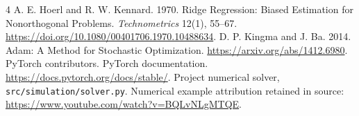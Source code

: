 \documentclass[sigconf]{acmart}
\begin{document}
\begin{thebibliography}{4}
 A. E. Hoerl and R. W. Kennard. 1970. Ridge Regression:
Biased Estimation for Nonorthogonal Problems. \textit{Technometrics} 12(1), 55--67.
\url{https://doi.org/10.1080/00401706.1970.10488634}.
 D. P. Kingma and J. Ba. 2014. Adam: A Method for Stochastic
Optimization. \url{https://arxiv.org/abs/1412.6980}.
 PyTorch contributors. PyTorch documentation.
\url{https://docs.pytorch.org/docs/stable/}.
 Project numerical solver, \texttt{src/simulation/solver.py}.
Numerical example attribution retained in source:
\url{https://www.youtube.com/watch?v=BQLvNLgMTQE}.
\end{thebibliography}
\end{document}
